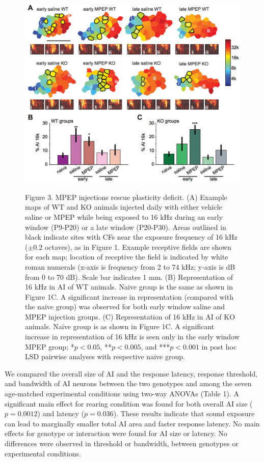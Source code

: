 \begin{figure}[p]
	\centering
		\includegraphics[width=6in]{images/C2F3}
	\begin{changemargin}{1in}{1in}
	\footnotesize{Figure 3. MPEP injections rescue plasticity deficit. (A) Example maps of WT and KO animals injected daily with either vehicle saline or MPEP while being exposed to 16 kHz during an early window (P9-P20) or a late window (P20-P30). Areas outlined in black indicate sites with CFs near the exposure frequency of 16 kHz ($\pm0.2$ octaves), as in Figure 1. Example receptive fields are shown for each map; location of receptive the field is indicated by white roman numerals (x-axis is frequency from 2 to 74 kHz; y-axis is dB from 0 to 70 dB). Scale bar indicates 1 mm. (B) Representation of 16 kHz in AI of WT animals. Naive group is the same as shown in Figure 1C. A significant increase in representation (compared with the naive group) was observed for both early window saline and MPEP injection groups. (C) Representation of 16 kHz in AI of KO animals. Naive group is as shown in Figure 1C. A significant increase in representation of 16 kHz is seen only in the early window MPEP group; *$p<0.05$, **$p<0.005$, and ***$p<0.001$ in post hoc LSD pairwise analyses with respective naive group.}
	\end{changemargin}
\end{figure}

We compared the overall size of AI and the response latency, response threshold, and bandwidth of AI neurons between the two genotypes and among the seven age-matched experimental conditions using two-way ANOVAs (Table 1). A significant main effect for rearing condition was found for both overall AI size ($p=0.0012$) and latency ($p=0.036$). These results indicate that sound exposure can lead to marginally smaller total AI area and faster response latency. No main effects for genotype or interaction were found for AI size or latency. No differences were observed in threshold or bandwidth, between genotypes or experimental conditions.

